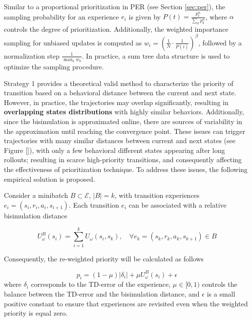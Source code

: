 Similar to a proportional prioritization in PER \cite{schaul2015prioritized} (see Section \ref{sec:per}), the sampling probability for an experience $e_i$ is given by $P(t) = \frac{p_t^\alpha}{\sum_k p_k^\alpha}$, where $\alpha$ controls the degree of prioritization. Additionally, the weighted importance sampling for unbiased updates is computed as $w_i = \left(\frac{1}{N} \cdot \frac{1}{P(i)} \right)^\beta$, followed by a normalization step $\frac{1}{\max_k w_k}$. In practice, a sum tree data structure is used to optimize the sampling procedure.

Strategy 1 provides a theoretical valid method to characterize the priority of transition based on a behavioral distance between the current and next state. However, in practice, the trajectories may overlap significantly, resulting in \textbf{overlapping states distributions} with highly similar behaviors. Additionally, since the bisimulation is approximated online, there are sources of variability in the approximation until reaching the convergence point. These issues can trigger trajectories with many similar distances between current and next states (see Figure \ref{}), with only a few behavioral different states appearing after long rollouts; resulting in scarce high-priority transitions, and consequently affecting the effectiveness of prioritization technique. To address these issues, the following empirical solution is proposed. 

\begin{strategy}
Consider a minibatch $B \subset \mathcal{E}$, $|B| = k$, with transition experiences $e_i = (s_i, r_i, a_i, s_{i+1})$. Each transition $e_i$ can be associated with a relative bisimulation distance

\begin{equation}
    U^B_\omega(s_i) = \sum_{i=1}^k U_\omega(s_i, s_k), \quad \forall e_k = (s_k, r_k, a_k, s_{k+1}) \in B
\end{equation}

Consequently, the re-weighted priority will be calculated as follows

\begin{equation}
    p_i = (1 - \mu) |\delta_i| + \mu U^B_\omega(s_i) + \epsilon
\end{equation}
where \(\delta_i\) corresponds to the TD-error of the experience, \(\mu \in [0,1)\) controls the balance between the TD-error and the bisimulation distance, and \(\epsilon\) is a small positive constant to ensure that experiences are revisited even when the weighted priority is equal zero.
\end{strategy}


